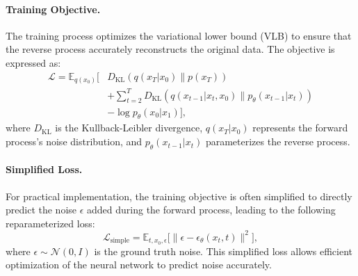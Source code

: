 \paragraph{Training Objective.}  
The training process optimizes the variational lower bound (VLB) to ensure that the reverse process accurately reconstructs the original data. The objective is expressed as:
\begin{align}
\mathcal{L} = \mathbb{E}_{q(x_0)} \bigg[ 
& D_{\mathrm{KL}}(q(x_T | x_0) \| p(x_T)) \nonumber \\
& + \sum_{t=2}^{T} D_{\mathrm{KL}}(q(x_{t-1} | x_t, x_0) \| p_\theta(x_{t-1} | x_t)) \nonumber \\
& - \log p_\theta(x_0 | x_1)
\bigg],
\end{align}
where \(D_{\mathrm{KL}}\) is the Kullback-Leibler divergence, \(q(x_T | x_0)\) represents the forward process’s noise distribution, and \(p_\theta(x_{t-1} | x_t)\) parameterizes the reverse process.

\paragraph{Simplified Loss.}  
For practical implementation, the training objective is often simplified to directly predict the noise \(\epsilon\) added during the forward process, leading to the following reparameterized loss:
\[
\mathcal{L}_{\mathrm{simple}} = \mathbb{E}_{t, x_0, \epsilon} \big[ \| \epsilon - \epsilon_\theta(x_t, t) \|^2 \big],
\]
where \(\epsilon \sim \mathcal{N}(0, I)\) is the ground truth noise. This simplified loss allows efficient optimization of the neural network to predict noise accurately.
